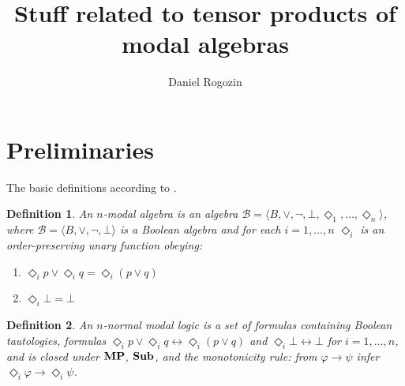 \documentclass[a4paper]{article}
\author{Daniel Rogozin}
\date{}
\title{Stuff related to tensor products of modal algebras}
\theoremstyle{defin}
\newtheorem{defin}{Definition}
\theoremstyle{theorem}
\theoremstyle{prop}
\theoremstyle{lemma}
\theoremstyle{ex}
\theoremstyle{col}
\begin{document}
\maketitle

\nocite{*}

\section{Preliminaries}

The basic definitions according to \cite{chagrov1997modal}.

\begin{defin} An $n$-modal algebra is an algebra $\mathcal{B} = \langle B, \vee, \neg, \bot, \Diamond_1, \dots, \Diamond_n \rangle$, where $\mathcal{B} = \langle B, \vee, \neg, \bot \rangle$ is a Boolean algebra and for each $i = 1,\dots,n$ $\Diamond_i$ is an order-preserving unary function obeying:
  \begin{enumerate}
    \item $\Diamond_i p \vee \Diamond_i q = \Diamond_i (p \vee q)$
    \item $\Diamond_i \bot = \bot$
  \end{enumerate}
\end{defin}

\begin{defin} An $n$-normal modal logic is a set of formulas containing Boolean tautologies, formulas $\Diamond_i p \vee \Diamond_i q \leftrightarrow \Diamond_i (p \vee q)$ and $\Diamond_i \bot \leftrightarrow \bot$ for $i = 1,\dots,n$, and is closed under ${\bf MP}$, ${\bf Sub}$, and the monotonicity rule: from $\varphi \to \psi$ infer $\Diamond_i \varphi \to \Diamond_i \psi$.
\end{defin}
\end{document}
